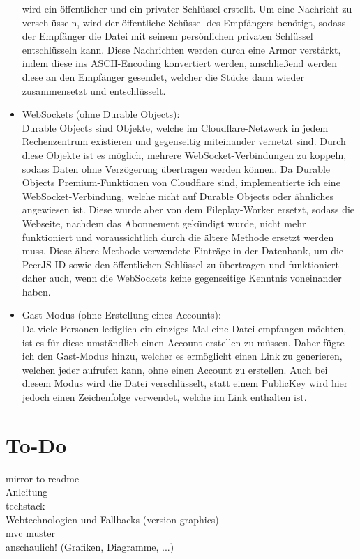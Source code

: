 \documentclass[a4paper]{article}
\begin{document}
\begin{itemize}
        wird ein öffentlicher und ein privater Schlüssel erstellt. Um eine Nachricht zu
        verschlüsseln, wird der öffentliche Schüssel des Empfängers benötigt, sodass der
        Empfänger die Datei mit seinem persönlichen privaten Schlüssel entschlüsseln kann.
        Diese Nachrichten werden durch eine Armor verstärkt, indem diese ins ASCII-Encoding
        konvertiert werden, anschließend werden diese an den Empfänger gesendet, welcher
        die Stücke dann wieder zusammensetzt und entschlüsselt.
  \item WebSockets (ohne Durable Objects):\\
        Durable Objects sind Objekte,
        welche im Cloudflare-Netzwerk in jedem Rechenzentrum existieren und gegenseitig miteinander
        vernetzt sind. Durch diese Objekte ist es möglich, mehrere WebSocket-Verbindungen zu koppeln,
        sodass Daten ohne Verzögerung übertragen werden können. Da Durable Objects Premium-Funktionen
        von Cloudflare sind, implementierte ich eine WebSocket-Verbindung, welche nicht auf Durable Objects
        oder ähnliches angewiesen ist. Diese wurde aber von dem Fileplay-Worker ersetzt, sodass
        die Webseite, nachdem das Abonnement gekündigt wurde, nicht mehr funktioniert und
        voraussichtlich durch die ältere Methode ersetzt werden muss. Diese ältere Methode verwendete
        Einträge in der Datenbank, um die PeerJS-ID sowie den öffentlichen Schlüssel zu übertragen und funktioniert
        daher auch, wenn die WebSockets keine gegenseitige Kenntnis voneinander haben.
  \item Gast-Modus (ohne Erstellung eines Accounts):\\
        Da viele Personen lediglich ein einziges Mal eine Datei empfangen möchten, ist es für diese umständlich
        einen Account erstellen zu müssen. Daher fügte ich den Gast-Modus hinzu, welcher es ermöglicht
        einen Link zu generieren, welchen jeder aufrufen kann, ohne einen Account zu erstellen. Auch bei diesem
        Modus wird die Datei verschlüsselt, statt einem PublicKey wird hier jedoch einen Zeichenfolge verwendet, welche
        im Link enthalten ist.
\end{itemize}

\section{To-Do}
mirror to readme\\
Anleitung\\
techstack\\
Webtechnologien und Fallbacks (version graphics)\\
mvc muster\\
anschaulich! (Grafiken, Diagramme, ...)
\end{document}
